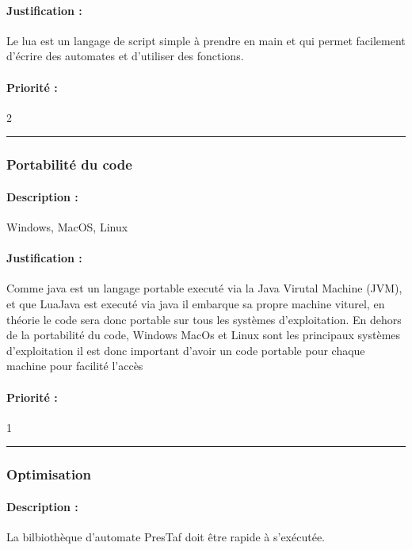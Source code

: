 \documentclass{article}%
\begin{document}
\paragraph{Justification :} Le lua est un langage de script simple à prendre en main et qui permet facilement d'écrire des automates et d'utiliser des fonctions.

\paragraph{Priorité :} 2\\

\rule{\linewidth}{1pt}

\subsubsection{Portabilité du code}

\paragraph{Description :} Windows, MacOS, Linux

\paragraph{Justification :} Comme java est un langage portable executé via la Java Virutal Machine (JVM), et que LuaJava est executé via java il embarque sa propre machine viturel, en théorie le code sera donc portable sur tous les systèmes d'exploitation. En dehors de la portabilité du code, Windows MacOs et Linux sont les principaux systèmes d'exploitation il est donc important d'avoir un code portable pour chaque machine pour facilité l'accès

\paragraph{Priorité :} 1\\

\rule{\linewidth}{1pt}

\subsubsection{Optimisation}

\paragraph{Description :} La bilbiothèque d'automate PresTaf doit être rapide à s'exécutée.
\end{document}
